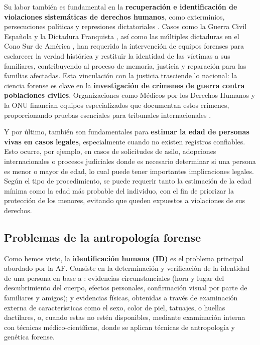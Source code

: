Su labor también es fundamental en la \textbf{recuperación e identificación de violaciones sistemáticas de
derechos humanos}, como exterminios, persecuciones políticas y represiones dictatoriales \cite{skinner2003}.
Casos como la Guerra Civil Española y la Dictadura Franquista \cite{sanchisgimeno2024, baeta2015}, así como 
las múltiples dictaduras en el Cono Sur de América \cite{ataliva2024}, han requerido la intervención de 
equipos forenses para esclarecer la verdad histórica y restituir la identidad de las víctimas a sus 
familiares, contribuyendo al proceso de memoria, justicia y reparación para las familias afectadas.
Esta vinculación con la justicia trasciende lo nacional: la ciencia forense es clave en la \textbf{investigación 
de crímenes de guerra contra poblaciones civiles}. Organizaciones como Médicos por los Derechos Humanos y la 
ONU financian equipos especializados que documentan estos crímenes, proporcionando pruebas esenciales para 
tribunales internacionales \cite{tanaka2020}.

Y por último, también son fundamentales para \textbf{estimar la edad de personas vivas en casos legales}, 
especialmente cuando no existen registros confiables. Esto ocurre, por ejemplo, en casos de solicitudes 
de asilo, adopciones internacionales o procesos judiciales donde es necesario determinar si una persona 
es menor o mayor de edad, lo cual puede tener importantes implicaciones legales. Según el tipo de 
procedimiento, se puede requerir tanto la estimación de la edad mínima como la edad más probable del 
individuo, con el fin de priorizar la protección de los menores, evitando que queden expuestos a 
violaciones de sus derechos.


\subsection{Problemas de la antropología forense}

Como hemos visto, la \textbf{identificación humana (ID)} es el problema principal abordado por la AF.
Consiste en la determinación y verificación de la identidad de una persona en base a \cite{thompson2006}: 
evidencias circunstanciales (hora y lugar del descubrimiento del cuerpo, efectos personales, confirmación 
visual por parte de familiares y amigos); y evidencias físicas, obtenidas a través de examinación externa
de características como el sexo, color de piel, tatuajes, o huellas dactilares, o, cuando estas no estén
disponibles, mediante examinación interna con técnicas médico-científicas, donde se aplican técnicas de 
antropología y genética forense.

